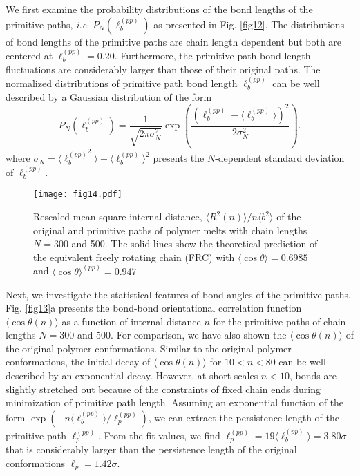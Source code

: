 \documentclass[pre,showpacs,notitlepage,twocolumn]{revtex4-1}
\begin{document}
We first examine the probability distributions of  the bond lengths of  the primitive paths, {\it i.e.} $P_N(\ell_b^{(pp)})$ as presented in Fig. \ref{fig12}. The distributions of bond lengths of the primitive paths  are chain length dependent 
but both are centered at  $\ell_b^{(pp)}=0.20$. Furthermore, the primitive path bond length 
 fluctuations  are considerably larger than those of their original paths. The normalized distributions of primitive path bond length $\ell_b^{(pp)}$ can be well described by a Gaussian distribution  of the form 
%
\begin{equation}
P_N(\ell_b^{(pp)})= \frac{1}{\sqrt{2\pi \sigma_{N}^2} }\exp \left(\frac{(\ell_b^{(pp)}-\langle \ell_b^{(pp)}\rangle)^2}{2  \sigma_N^2} \right).
\label{eq:Gaussian1}
\end{equation}
%
where $\sigma_N=\langle {\ell_b^{(pp)}}^2\rangle-\langle \ell_b^{(pp)}\rangle^2$ presents the  $N$-dependent standard deviation of $\ell_b^{(pp)}$.
\begin{figure}[t]
\texttt{[image: fig14.pdf]}
\caption{Rescaled mean square internal distance, $\langle R^2(n) \rangle/ n  \langle b^2 \rangle $  of the original and  primitive paths of  polymer melts with chain lengths $N=300$ and 500. The solid lines show the theoretical prediction of  the equivalent freely rotating
chain (FRC)  with $ \langle \cos \theta \rangle=0.6985 $ and   $ \langle \cos \theta \rangle^{(pp)}=0.947$.  }
\label{fig14} 
\end{figure}
%


Next, we  investigate the statistical features of  bond angles of the primitive paths. Fig. \ref{fig13}a presents the  bond-bond orientational correlation function $ \langle \cos \theta  (n) \rangle$ as a function of
internal distance  $n$ for the primitive paths of chain lengths $N=300$ and 500.  For comparison, we have also shown the $ \langle \cos \theta  (n) \rangle$ of the original polymer conformations.
Similar to the original polymer conformations, the initial decay of  $ \langle \cos \theta  (n) \rangle$  for $10< n < 80$ can be well described by an exponential decay. However, at
short scales $n<10$, bonds are slightly stretched out because of the constraints of fixed chain ends during minimization of primitive path length.
Assuming an exponential function of the form $\exp(-n \langle \ell_b^{(pp)}\rangle/\ell_p^{(pp)} )$, we can extract the persistence length of the primitive path $\ell_p^{(pp)}$.
 From the fit values, we find  $\ell_p^{(pp)}=19 \langle \ell_b^{(pp)}\rangle=3.80 \sigma$ that is considerably larger than the persistence length of the original conformations $\ell_p=1.42 \sigma$.
 
\end{document}

